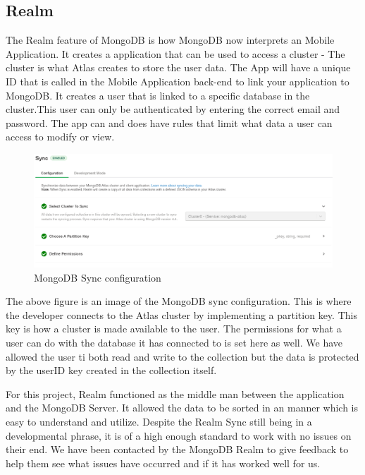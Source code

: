 \subsection{Realm}
The Realm feature of MongoDB is how MongoDB now interprets an Mobile Application. It creates a application that can be used to access a cluster - The cluster is what Atlas creates to store the user data. 
\newline
The App will have a unique ID that is called in the Mobile Application back-end to link your application to MongoDB. It creates a user that is linked to a specific database in the cluster.This user can only be authenticated by entering the correct email and password. The app can and does have rules that limit what data a user can access to modify or view.
\newline
\begin{figure}[H]
    \centering
    \includegraphics[width=12cm]{img/syncSetup.PNG}
    \caption{MongoDB Sync configuration}
    \label{fig:altas config}
\end{figure}
The above figure is an image of the MongoDB sync configuration. This is where the developer connects to the Atlas cluster by implementing a partition key. This key is how a cluster is made available to the user. The permissions for what a user can do with the database it has connected to is set here as well. We have allowed the user ti both read and write to the collection but the data is protected by the userID key created in the collection itself.

For this project, Realm functioned as the middle man between the application and the MongoDB Server. It allowed the data to be sorted in an manner which is easy to understand and utilize. Despite the Realm Sync still being in a developmental phrase, it is of a high enough standard to work with no issues on their end. We have been contacted by the MongoDB Realm to give feedback to help them see what issues have occurred and if it has worked well for us.

